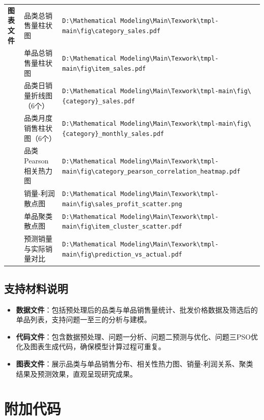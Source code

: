 \documentclass{cumcmthesis} %
\begin{document}
\begin{appendices}
\begin{center}
\begin{longtable}{p{2cm}<{\centering} p{5cm}<{\centering} p{8cm}<{\centering}}
        \midrule
        \textbf{图表文件} & 品类总销售量柱状图 & \verb|D:\Mathematical Modeling\Main\Texwork\tmpl-main\fig\category_sales.pdf| \\
        & 单品总销售量柱状图 & \verb|D:\Mathematical Modeling\Main\Texwork\tmpl-main\fig\item_sales.pdf| \\
        & 品类日销量折线图（6个） & \verb|D:\Mathematical Modeling\Main\Texwork\tmpl-main\fig\{category}_sales.pdf| \\
        & 品类月度销售柱状图（6个） & \verb|D:\Mathematical Modeling\Main\Texwork\tmpl-main\fig\{category}_monthly_sales.pdf| \\
        & 品类Pearson相关热力图 & \verb|D:\Mathematical Modeling\Main\Texwork\tmpl-main\fig\category_pearson_correlation_heatmap.pdf| \\
        & 销量-利润散点图 & \verb|D:\Mathematical Modeling\Main\Texwork\tmpl-main\fig\sales_profit_scatter.png| \\
        & 单品聚类散点图 & \verb|D:\Mathematical Modeling\Main\Texwork\tmpl-main\fig\item_cluster_scatter.pdf| \\
        & 预测销量与实际销量对比 & \verb|D:\Mathematical Modeling\Main\Texwork\tmpl-main\fig\prediction_vs_actual.pdf| \\
        
        \bottomrule[1.5pt]
    \end{longtable}
\end{center}


\subsection*{支持材料说明}

\begin{itemize}
    \item \textbf{数据文件}：包括预处理后的品类与单品销售量统计、批发价格数据及筛选后的单品列表，支持问题一至三的分析与建模。
    \item \textbf{代码文件}：包含数据预处理、问题一分析、问题二预测与优化、问题三PSO优化及图表生成代码，确保模型计算过程可重复。
    \item \textbf{图表文件}：展示品类与单品销售分布、相关性热力图、销量-利润关系、聚类结果及预测效果，直观呈现研究成果。
\end{itemize}
    




    \section{附加代码}
    

\end{appendices}
\end{document}
